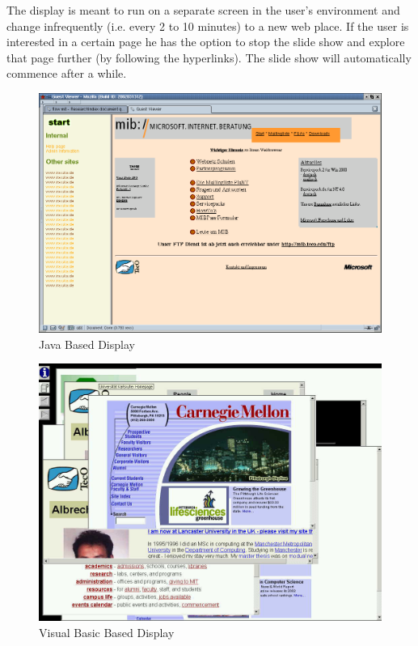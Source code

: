 \documentclass[a4paper]{danarticle}
\theoremstyle{remark}
\begin{document}
      The display is meant to run on a separate screen in the user's environment
      and change infrequently (i.e. every 2 to 10 minutes) to a new web place.
      If the user is interested in a certain page he has the option to stop the
      slide show and explore that page further (by following the hyperlinks). 
      The slide show will automatically commence after a while.
      \begin{figure}[ht]
       \centering
	 \includegraphics[width=12cm]{javaclient}
	 \caption{Java Based Display}
	 \label{javaclient}
       \end{figure}
      \begin{figure}[ht]
        \centering
        \includegraphics[width=12cm]{vbclient}
        \caption{Visual Basic Based Display}
        \label{vbclient}
      \end{figure}
      
\end{document}
